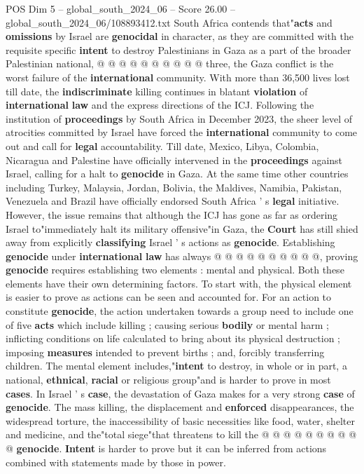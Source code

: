 \begin{textsample}{POS Dim 5 – global\_south\_2024\_06 – Score 26.00 – global\_south\_2024\_06/108893412.txt}
South Africa contends that"\textbf{acts} and \textbf{omissions} by Israel are \textbf{genocidal} in character, as they are committed with the requisite specific \textbf{intent} to destroy Palestinians in Gaza as a part of the broader Palestinian national, @ @ @ @ @ @ @ @ @ @ three, the Gaza conflict is the worst failure of the \textbf{international} community.
With more than 36,500 lives lost till date, the \textbf{indiscriminate} killing continues in blatant \textbf{violation} of \textbf{international} \textbf{law} and the express directions of the ICJ.
Following the institution of \textbf{proceedings} by South Africa in December 2023, the sheer level of atrocities committed by Israel have forced the \textbf{international} community to come out and call for \textbf{legal} accountability.
Till date, Mexico, Libya, Colombia, Nicaragua and Palestine have officially intervened in the \textbf{proceedings} against Israel, calling for a halt to \textbf{genocide} in Gaza.
At the same time other countries including Turkey, Malaysia, Jordan, Bolivia, the Maldives, Namibia, Pakistan, Venezuela and Brazil have officially endorsed South Africa ' s \textbf{legal} initiative.
However, the issue remains that although the ICJ has gone as far as ordering Israel to"immediately halt its military offensive"in Gaza, the \textbf{Court} has still shied away from explicitly \textbf{classifying} Israel ' s actions as \textbf{genocide}.
Establishing \textbf{genocide} under \textbf{international} \textbf{law} has always @ @ @ @ @ @ @ @ @ @, proving \textbf{genocide} requires establishing two elements : mental and physical.
Both these elements have their own determining factors.
To start with, the physical element is easier to prove as actions can be seen and accounted for.
For an action to constitute \textbf{genocide}, the action undertaken towards a group need to include one of five \textbf{acts} which include killing ; causing serious \textbf{bodily} or mental harm ; inflicting conditions on life calculated to bring about its physical destruction ; imposing \textbf{measures} intended to prevent births ; and, forcibly transferring children.
The mental element includes,"\textbf{intent} to destroy, in whole or in part, a national, \textbf{ethnical}, \textbf{racial} or religious group"and is harder to prove in most \textbf{cases}.
In Israel ' s \textbf{case}, the devastation of Gaza makes for a very strong \textbf{case} of \textbf{genocide}.
The mass killing, the displacement and \textbf{enforced} disappearances, the widespread torture, the inaccessibility of basic necessities like food, water, shelter and medicine, and the"total siege"that threatens to kill the @ @ @ @ @ @ @ @ @ @ \textbf{genocide}. \textbf{Intent} is harder to prove but it can be inferred from actions combined with statements made by those in power.

\end{textsample}
